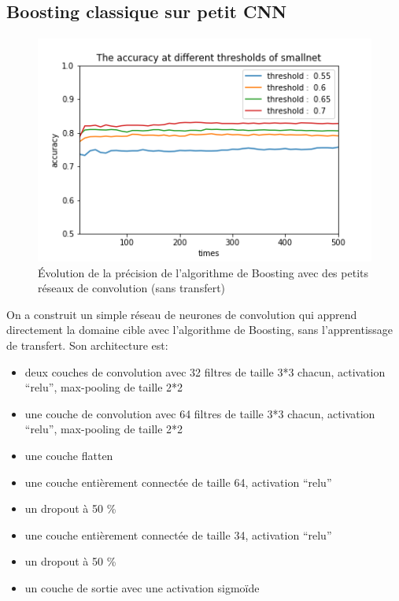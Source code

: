 \documentclass[11 pt]{article}
\begin{document}
\subsection{Boosting classique sur petit CNN}
\paragraph{}

\begin{figure}[H]
\begin{center}
\centerline{\includegraphics[width=\textwidth]{smallnet.png}}
\caption{Évolution de la précision de l'algorithme de Boosting avec des petits réseaux de convolution (sans transfert) }
\label{fig:smallNet}
\end{center}
\end{figure}

\begin{samepage}
On a construit un simple réseau de neurones de convolution  qui apprend directement la domaine cible avec l'algorithme de Boosting, sans l'apprentissage de transfert. Son architecture est:\\ \medskip \nopagebreak
  \begin{itemize}
    \item deux couches de convolution avec 32 filtres de taille 3*3 chacun, activation “relu”, max-pooling de taille 2*2
    \nopagebreak
    \item une couche de convolution avec 64 filtres de taille 3*3 chacun, activation “relu”, max-pooling de taille 2*2
    \nopagebreak 
    \item une couche flatten 
    \nopagebreak
    \item une couche entièrement connectée de taille 64, activation “relu”
    \nopagebreak
    \item un dropout à 50 \%
    \nopagebreak
    \item une couche entièrement connectée de taille 34, activation “relu”
    \nopagebreak
    \item un dropout à 50 \%
    \nopagebreak
    \item un couche de sortie avec une activation sigmoïde
  \end{itemize}
\end{samepage}
\end{document}
